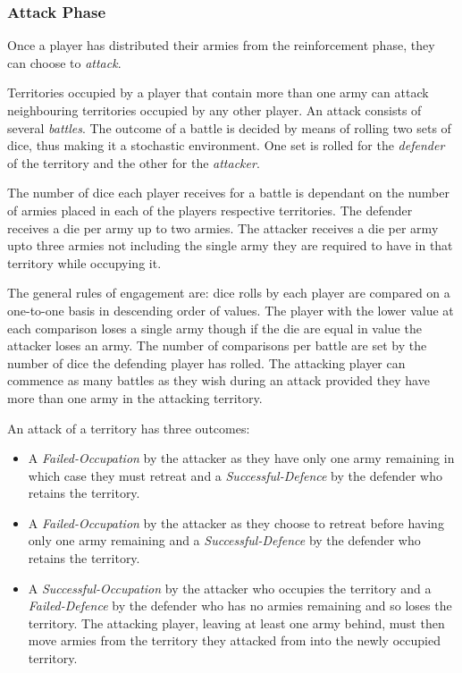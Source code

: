 \documentclass[parskip]{cs4rep}
\begin{document}
\subsubsection{Attack Phase}

Once a player has distributed their armies from the reinforcement phase, they can choose to \textit{attack}. 

Territories occupied by a player that contain more than one army can attack neighbouring territories occupied by any other player. An attack consists of several \textit{battles}. The outcome of a battle is decided by means of rolling two sets of dice, thus making it a stochastic environment. One set is rolled for the \textit{defender} of the territory and the other for the \textit{attacker}. 

The number of dice each player receives for a battle is dependant on the number of armies placed in each of the players respective territories. The defender receives a die per army up to two armies. The attacker receives a die per army upto three armies not including the single army they are required to have in that territory while occupying it. 

The general rules of engagement are: dice rolls by each player are compared on a one-to-one basis in descending order of values. The player with the lower value at each comparison loses a single army though if the die are equal in value the attacker loses an army. The number of comparisons per battle are set by the number of dice the defending player has rolled. The attacking player can commence as many battles as they wish during an attack provided they have more than one army in the attacking territory.

An attack of a territory has three outcomes:

\begin{itemize}
\item
A \textit{Failed-Occupation} by the attacker as they have only one army remaining in which case they must retreat and a \textit{Successful-Defence} by the defender who retains the territory.
\item
A \textit{Failed-Occupation} by the attacker as they choose to retreat before having only one army remaining and a \textit{Successful-Defence} by the defender who retains the territory.
\item
A \textit{Successful-Occupation} by the attacker who occupies the territory and a \textit{Failed-Defence} by the defender who has no armies remaining and so loses the territory. The attacking player, leaving at least one army behind, must then move armies from the territory they attacked from into the newly occupied territory.
\end{itemize}
\end{document}
